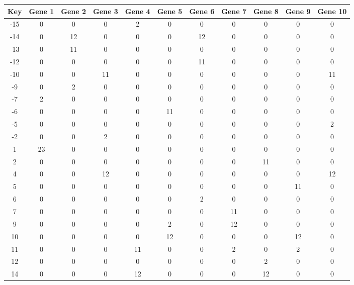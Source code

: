 \begin{tabular}{|c|c|c|c|c|c|c|c|c|c|c|}
\hline
Key & Gene 1 & Gene 2 & Gene 3 & Gene 4 & Gene 5 & Gene 6 & Gene 7 & Gene 8 & Gene 9 & Gene 10 \\
\hline
-15 & 0 & 0 & 0 & 2 & 0 & 0 & 0 & 0 & 0 & 0 \\
-14 & 0 & 12 & 0 & 0 & 0 & 12 & 0 & 0 & 0 & 0 \\
-13 & 0 & 11 & 0 & 0 & 0 & 0 & 0 & 0 & 0 & 0 \\
-12 & 0 & 0 & 0 & 0 & 0 & 11 & 0 & 0 & 0 & 0 \\
-10 & 0 & 0 & 11 & 0 & 0 & 0 & 0 & 0 & 0 & 11 \\
-9 & 0 & 2 & 0 & 0 & 0 & 0 & 0 & 0 & 0 & 0 \\
-7 & 2 & 0 & 0 & 0 & 0 & 0 & 0 & 0 & 0 & 0 \\
-6 & 0 & 0 & 0 & 0 & 11 & 0 & 0 & 0 & 0 & 0 \\
-5 & 0 & 0 & 0 & 0 & 0 & 0 & 0 & 0 & 0 & 2 \\
-2 & 0 & 0 & 2 & 0 & 0 & 0 & 0 & 0 & 0 & 0 \\
1 & 23 & 0 & 0 & 0 & 0 & 0 & 0 & 0 & 0 & 0 \\
2 & 0 & 0 & 0 & 0 & 0 & 0 & 0 & 11 & 0 & 0 \\
4 & 0 & 0 & 12 & 0 & 0 & 0 & 0 & 0 & 0 & 12 \\
5 & 0 & 0 & 0 & 0 & 0 & 0 & 0 & 0 & 11 & 0 \\
6 & 0 & 0 & 0 & 0 & 0 & 2 & 0 & 0 & 0 & 0 \\
7 & 0 & 0 & 0 & 0 & 0 & 0 & 11 & 0 & 0 & 0 \\
9 & 0 & 0 & 0 & 0 & 2 & 0 & 12 & 0 & 0 & 0 \\
10 & 0 & 0 & 0 & 0 & 12 & 0 & 0 & 0 & 12 & 0 \\
11 & 0 & 0 & 0 & 11 & 0 & 0 & 2 & 0 & 2 & 0 \\
12 & 0 & 0 & 0 & 0 & 0 & 0 & 0 & 2 & 0 & 0 \\
14 & 0 & 0 & 0 & 12 & 0 & 0 & 0 & 12 & 0 & 0 \\
\hline
\end{tabular}